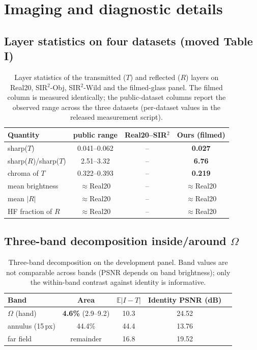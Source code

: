 \documentclass[10pt]{article}
\newcommand{\Om}{\Omega}
\begin{document}
\section{Imaging and diagnostic details}\label{supp:diag}
\subsection{Layer statistics on four datasets (moved Table I)}
\begin{table}[h]\centering
\caption{Layer statistics of the transmitted ($T$) and reflected ($R$) layers on
Real20, SIR$^2$-Obj, SIR$^2$-Wild and the filmed-glass panel. The filmed column is
measured identically; the public-dataset columns report the observed range across the
three datasets (per-dataset values in the released measurement script).}
\begin{tabular}{@{}lccc@{}}
\toprule
Quantity & public range & Real20--SIR$^2$ & Ours (filmed) \\
\midrule
sharp($T$) & 0.041--0.062 & -- & \textbf{0.027} \\
sharp($R$)/sharp($T$) & 2.51--3.32 & -- & \textbf{6.76} \\
chroma of $T$ & 0.322--0.393 & -- & \textbf{0.219} \\
mean brightness & ${}\approx{}$Real20 & -- & ${}\approx{}$Real20 \\
mean $|R|$ & ${}\approx{}$Real20 & -- & ${}\approx{}$Real20 \\
HF fraction of $R$ & ${}\approx{}$Real20 & -- & ${}\approx{}$Real20 \\
\bottomrule
\end{tabular}
\end{table}

\subsection{Three-band decomposition inside/around $\Om$}
\begin{table}[h]\centering
\caption{Three-band decomposition on the development panel. Band values are not
comparable across bands (PSNR depends on band brightness); only the within-band
contrast against identity is informative.}
\begin{tabular}{@{}lcccc@{}}
\toprule
Band & Area & $\mathbb{E}|I-T|$ & Identity PSNR (dB) \\
\midrule
$\Om$ (hand) & \textbf{4.6\%} (2.9--9.2) & 10.3 & 24.52 \\
annulus (15\,px) & 44.4\% & 44.4 & 13.76 \\
far field & remainder & 16.8 & 19.52 \\
\bottomrule
\end{tabular}
\end{table}
\end{document}
